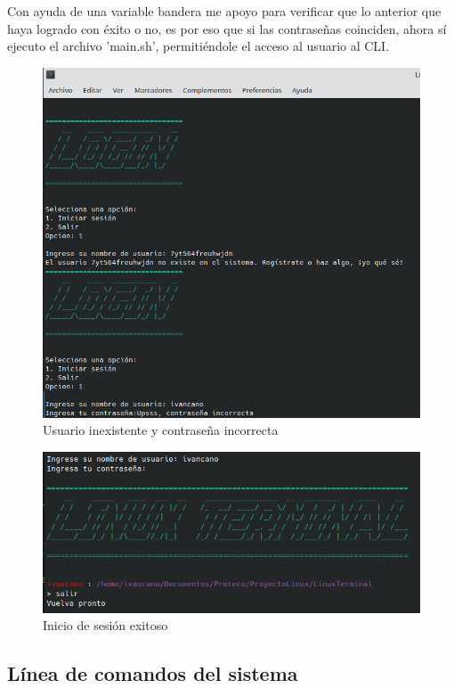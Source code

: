 \documentclass[letter,11pt]{article}
\begin{document}
Con ayuda de una variable bandera me apoyo para verificar que lo anterior que haya logrado con éxito o no, es por eso que si las contraseñas coinciden, ahora sí ejecuto el archivo 'main.sh', permitiéndole el acceso al usuario al CLI.

\begin{figure} 
    \centering
    \caption{Usuario inexistente y contraseña incorrecta}
    \includegraphics[scale=.6]{sesion1.png} 
\end{figure}

\begin{figure} 
    \centering 
    \caption{Inicio de sesión exitoso}
    \includegraphics[scale=.6]{sesion2.png} 
\end{figure}


\newpage
\subsection{Línea de comandos del sistema}
\end{document}
